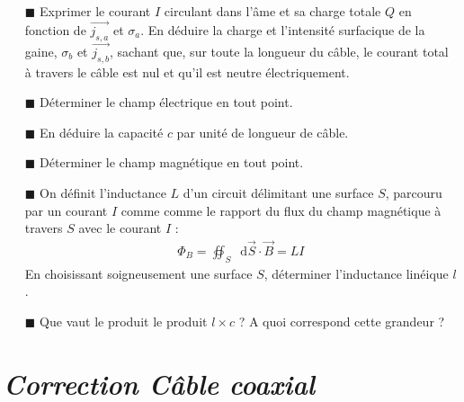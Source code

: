 \documentclass{report}
\newcommand*\dif{\mathop{}\!\mathrm{d}}
\begin{document}
\begin{itemize}

	\item[$\blacksquare$] Exprimer le courant $I$ circulant dans l'âme et sa charge totale $Q$ en fonction de $\vec{j_{s,a}}$ et $\sigma_a$. En déduire la charge et l'intensité surfacique de la gaine, $\sigma_b$ et $\vec{j_{s,b}}$, sachant que, sur toute la longueur du câble, le courant total à travers le câble est nul et qu'il est neutre électriquement.
	
	\item[$\blacksquare$] Déterminer le champ électrique en tout point.

	\item[$\blacksquare$] En déduire la capacité $c$ par unité de longueur de câble. 
	
	\item[$\blacksquare$]	 Déterminer le champ magnétique en tout point. 
	
	\item[$\blacksquare$] On définit l'inductance $L$ d'un circuit délimitant une surface $S$, parcouru par un courant $I$ comme  comme le rapport du flux du champ magnétique à travers $S$ avec le courant $I$ :
	\begin{align*}
		\Phi_B=\oiint_S \dif \vec{S}\cdot\vec{B}=LI
	\end{align*}
En choisissant soigneusement une surface $S$, déterminer l'inductance linéique $l$. 

	\item[$\blacksquare$] Que vaut le produit le produit $l\times c$ ? A quoi correspond cette grandeur ?
	
\end{itemize}

\newpage

\section*{\textit{Correction Câble coaxial}}
\end{document}
